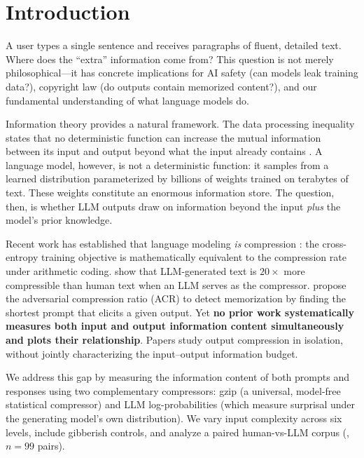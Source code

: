 \section{Introduction}
\label{sec:intro}

A user types a single sentence and receives paragraphs of fluent, detailed text. Where does the ``extra'' information come from? This question is not merely philosophical---it has concrete implications for AI safety (can models leak training data?), copyright law (do outputs contain memorized content?), and our fundamental understanding of what language models do.

Information theory provides a natural framework. The data processing inequality states that no deterministic function can increase the mutual information between its input and output beyond what the input already contains \cite{cover1999elements}. A language model, however, is not a deterministic function: it samples from a learned distribution parameterized by billions of weights trained on terabytes of text. These weights constitute an enormous information store. The question, then, is whether LLM outputs draw on information beyond the input \emph{plus} the model's prior knowledge.

Recent work has established that language modeling \emph{is} compression \cite{deletang2024language}: the cross-entropy training objective is mathematically equivalent to the compression rate under arithmetic coding. \citet{wang2025lossless} show that LLM-generated text is $20\times$ more compressible than human text when an LLM serves as the compressor. \citet{schwarzschild2024adversarial} propose the adversarial compression ratio (ACR) to detect memorization by finding the shortest prompt that elicits a given output. Yet \textbf{no prior work systematically measures both input and output information content simultaneously and plots their relationship}. Papers study output compression in isolation, without jointly characterizing the input--output information budget.

We address this gap by measuring the information content of both prompts and responses using two complementary compressors: gzip (a universal, model-free statistical compressor) and LLM log-probabilities (which measure surprisal under the generating model's own distribution). We vary input complexity across six levels, include gibberish controls, and analyze a paired human-vs-LLM corpus (\gptwiki, $n=99$ pairs).

